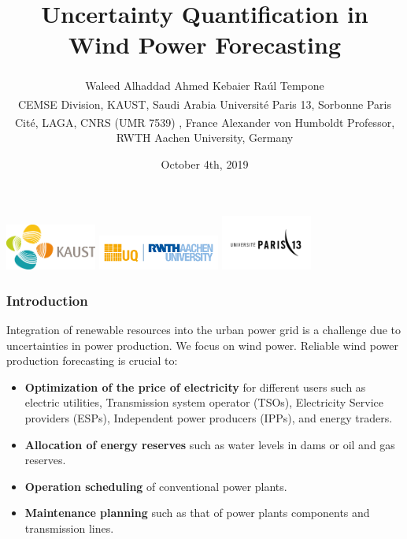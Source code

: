 \documentclass[aspectratio=169]{beamer}\usepackage[utf8]{inputenc}
\title{Uncertainty Quantification in Wind Power Forecasting}
\author{ Waleed Alhaddad\textsuperscript{\textasteriskcentered} \qquad Ahmed Kebaier\textsuperscript{\ddag} \qquad Ra\'ul  Tempone\textsuperscript{\textasteriskcentered}\textsuperscript{\textdagger} \\  \vskip 0.2in
\textsuperscript{\textasteriskcentered}CEMSE Division, KAUST, Saudi Arabia \vskip 0.05in  \textsuperscript{\ddag}Université Paris 13, Sorbonne Paris Cité, LAGA, CNRS (UMR 7539) , France\vskip 0.05in  
 \textsuperscript{\textdagger}Alexander von Humboldt Professor, RWTH Aachen  University,  Germany}
\begin{document}
\date{October 4th, 2019}


\begin{frame}
\center
  \includegraphics[width=30mm,scale=1]{KAUST_Logo.pdf}\quad 
  \includegraphics[width=40mm,scale=1]{rwth_UQ.png}\quad 
  \includegraphics[width=30mm,scale=1]{UParis_13.png} \quad
 \vspace*{0.2in}
\titlepage
\end{frame}

\begin{frame}[label=guide]\frametitle{ Introduction }
Integration of renewable resources into the urban power grid is a challenge due to uncertainties in power production. We focus on wind power. Reliable wind power production forecasting is crucial to:
\begin{itemize}
\item \textbf{Optimization of the price of electricity} for different users such as electric utilities, Transmission system operator (TSOs), Electricity Service providers (ESPs), Independent power producers (IPPs), and energy traders.
\item \textbf{Allocation of energy reserves} such as water levels in dams or oil and gas reserves.
\item \textbf{Operation scheduling} of conventional power plants.
\item \textbf{Maintenance planning} such as that of power plants components and transmission lines.
\end{itemize}

\end{frame}
\end{document}
